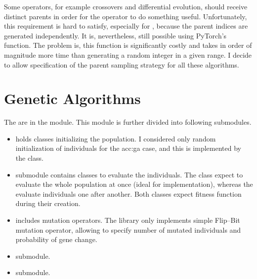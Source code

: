 Some operators, for example crossovers and differential evolution, should receive distinct parents in order for the operator to do something useful. Unfortunately, this requirement is hard to satisfy, especially for \gpuns, because the parent indices are generated independently. It is, nevertheless, still possible using PyTorch's  function. The problem is, this function is significantly costly and takes in order of magnitude more time than generating a random integer in a given range. I decide to allow specification of the parent sampling strategy for all these algorithms.



\section{Genetic Algorithms}
\label{chap:gaimpl}

The  are in the  module. This module is further divided into following submodules.
\begin{itemize}
    \item {} holds classes initializing the population. I considered only random initialization of individuals for the \acrshort{acc:ga} case, and this is implemented by the  class.
    \item {} submodule contains classes to evaluate the individuals. The  class expect to evaluate the whole population at once (ideal for \gpu implementation), whereas the  evaluate individuals one after another. Both classes expect fitness function during their creation.
    \item {} includes mutation operators. The library only implements simple Flip--Bit mutation operator, allowing to specify number of mutated individuals and probability of gene change.
    \item {} submodule.
    \item {} submodule.
\end{itemize}

